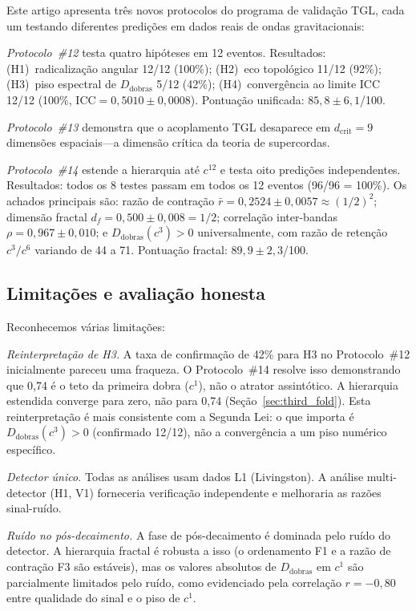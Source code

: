 \documentclass[12pt,a4paper,twocolumn]{article}
\newcommand{\Dfolds}{D_{\text{dobras}}}
\newcommand{\CCI}{\text{ICC}}
\begin{document}
Este artigo apresenta três novos protocolos do programa de validação TGL, cada um testando diferentes predições em dados reais de ondas gravitacionais:

\textit{Protocolo~\#12} testa quatro hipóteses em 12 eventos. Resultados: (H1)~radicalização angular 12/12 (100\%); (H2)~eco topológico 11/12 (92\%); (H3)~piso espectral de $\Dfolds$ 5/12 (42\%); (H4)~convergência ao limite ICC 12/12 (100\%, $\CCI = 0{,}5010 \pm 0{,}0008$). Pontuação unificada: $85{,}8 \pm 6{,}1$/100.

\textit{Protocolo~\#13} demonstra que o acoplamento TGL desaparece em $d_{\text{crit}} = 9$ dimensões espaciais---a dimensão crítica da teoria de supercordas.

\textit{Protocolo~\#14} estende a hierarquia até $c^{12}$ e testa oito predições independentes. Resultados: todos os 8 testes passam em todos os 12 eventos (96/96 = 100\%). Os achados principais são: razão de contração $\bar{r} = 0{,}2524 \pm 0{,}0057 \approx (1/2)^2$; dimensão fractal $d_f = 0{,}500 \pm 0{,}008 = 1/2$; correlação inter-bandas $\rho = 0{,}967 \pm 0{,}010$; e $\Dfolds(c^3) > 0$ universalmente, com razão de retenção $c^3/c^6$ variando de 44 a 71. Pontuação fractal: $89{,}9 \pm 2{,}3$/100.

\subsection{Limitações e avaliação honesta}

Reconhecemos várias limitações:

\textit{Reinterpretação de H3.} A taxa de confirmação de 42\% para H3 no Protocolo~\#12 inicialmente pareceu uma fraqueza. O Protocolo~\#14 resolve isso demonstrando que 0,74 é o teto da primeira dobra ($c^1$), não o atrator assintótico. A hierarquia estendida converge para zero, não para 0,74 (Seção~\ref{sec:third_fold}). Esta reinterpretação é mais consistente com a Segunda Lei: o que importa é $\Dfolds(c^3) > 0$ (confirmado 12/12), não a convergência a um piso numérico específico.

\textit{Detector único.} Todas as análises usam dados L1 (Livingston). A análise multi-detector (H1, V1) forneceria verificação independente e melhoraria as razões sinal-ruído.

\textit{Ruído no pós-decaimento.} A fase de pós-decaimento é dominada pelo ruído do detector. A hierarquia fractal é robusta a isso (o ordenamento F1 e a razão de contração F3 são estáveis), mas os valores absolutos de $\Dfolds$ em $c^1$ são parcialmente limitados pelo ruído, como evidenciado pela correlação $r = -0{,}80$ entre qualidade do sinal e o piso de $c^1$.
\end{document}

